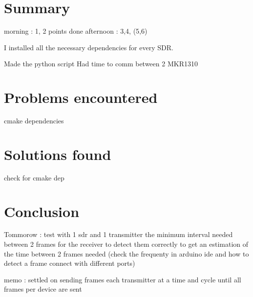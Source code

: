 \documentclass[a4paper, 12pt]{article}
\begin{document}
\section{Summary}
morning : 1, 2 points done 
afternoon : 3,4, (5,6)

I installed all the necessary dependencies for every SDR.

Made the python script 
Had time to comm between 2 MKR1310



\section{Problems encountered} 
cmake dependencies

\section{Solutions found}
check for cmake dep

\section{Conclusion}
Tommorow : test with 1 sdr and 1 transmitter the minimum interval needed between 2 frames for the receiver to detect them correctly
to get an estimation of the time between 2 frames needed
(check the frequenty in arduino ide and how to detect a frame connect with different ports)

memo : settled on sending frames each transmitter at a time and cycle until all frames per device are sent
\end{document}
